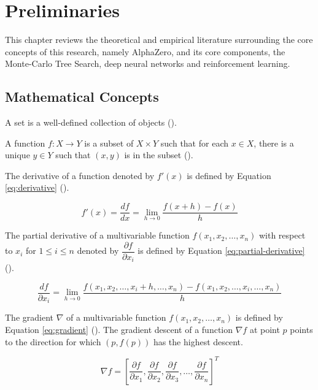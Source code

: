 \chapter{Preliminaries}

This chapter reviews the theoretical and empirical literature surrounding the core concepts of this research, namely AlphaZero, and its core components, the Monte-Carlo Tree Search, deep neural networks and reinforcement learning.

\section{Mathematical Concepts}

A set is a well-defined collection of objects (\cite{diestel2024graph}).

A function $f: X \to Y$ is a subset of $X \times Y$ such that for each $x \in X$, there is a unique $y \in Y$ such that $(x, y) $ is in the subset (\cite{thielman1953definition}).

The derivative of a function denoted by $f'(x)$ is defined by Equation \ref{eq:derivative} (\cite{leithold1972calculus}).

\begin{equation}
    f'(x) = \frac{df}{dx} = \lim_{h \to 0} \frac{f(x+h) - f(x)}{h}
    \label{eq:derivative}
\end{equation}

The partial derivative of a multivariable function $f(x_1, x_2, \ldots, x_n)$ with respect to $x_i$ for $1 \le i \le n$ denoted by $\dfrac{\partial f}{\partial x_i}$ is defined by Equation \ref{eq:partial-derivative} (\cite{widder2012advanced}).

\begin{equation}
    \frac{df}{\partial x_i} = \lim_{h \to 0} \frac{f(x_1, x_2, \ldots, x_i + h, \ldots, x_n) - f(x_1, x_2, \ldots, x_i, \ldots, x_n)}{h}
    \label{eq:partial-derivative}
\end{equation}

The gradient $\nabla$ of a multivariable function $f(x_1, x_2, \ldots, x_n)$ is defined by Equation \ref{eq:gradient} (\cite{calder2020calculus}). The gradient descent of a function $\nabla f$ at point $p$ points to the direction for which $(p, f(p))$ has the highest descent.

\begin{equation}
    \nabla f = \left[\dfrac{\partial f}{\partial x_{1}}, \dfrac{\partial f}{\partial x_{2}}, \dfrac{\partial f}{\partial x_{3}}, \ldots, \dfrac{\partial f}{\partial x_{n}} \right]^T
    \label{eq:gradient}
\end{equation}

